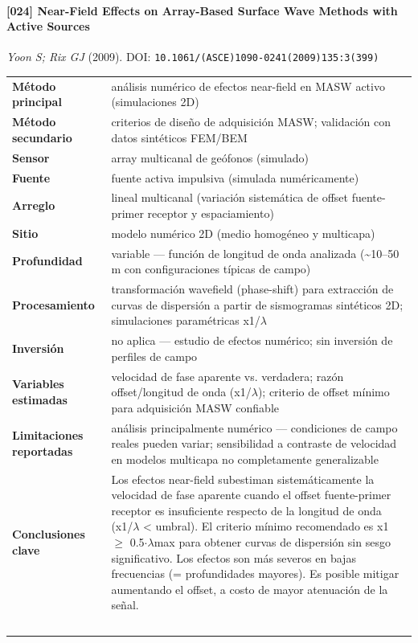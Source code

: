 \paragraph{[024] Near-Field Effects on Array-Based Surface Wave Methods with Active Sources} \emph{Yoon S; Rix GJ} (2009).
{\scriptsize DOI: \texttt{10.1061/(ASCE)1090-0241(2009)135:3(399)}}

\begin{center}\scriptsize
\begin{tabularx}{\textwidth}{@{}>{\bfseries}p{3.3cm} X@{}}
\toprule
M\'etodo principal & análisis numérico de efectos near-field en MASW activo (simulaciones 2D) \\
M\'etodo secundario & criterios de diseño de adquisición MASW; validación con datos sintéticos FEM/BEM \\
Sensor & array multicanal de geófonos (simulado) \\
Fuente & fuente activa impulsiva (simulada numéricamente) \\
Arreglo & lineal multicanal (variación sistemática de offset fuente-primer receptor y espaciamiento) \\
Sitio & modelo numérico 2D (medio homogéneo y multicapa) \\
Profundidad & variable --- función de longitud de onda analizada (\textasciitilde{}10--50 m con configuraciones típicas de campo) \\
Procesamiento & transformación wavefield (phase-shift) para extracción de curvas de dispersión a partir de sismogramas sintéticos 2D; simulaciones paramétricas x1/$\lambda$ \\
Inversi\'on & no aplica --- estudio de efectos numérico; sin inversión de perfiles de campo \\
Variables estimadas & velocidad de fase aparente vs. verdadera; razón offset/longitud de onda (x1/$\lambda$); criterio de offset mínimo para adquisición MASW confiable \\
Limitaciones reportadas & análisis principalmente numérico --- condiciones de campo reales pueden variar; sensibilidad a contraste de velocidad en modelos multicapa no completamente generalizable \\
Conclusiones clave & Los efectos near-field subestiman sistemáticamente la velocidad de fase aparente cuando el offset fuente-primer receptor es insuficiente respecto de la longitud de onda (x1/$\lambda$ < umbral). El criterio mínimo recomendado es x1 $\geq$ 0.5$\cdot$$\lambda$max para obtener curvas de dispersión sin sesgo significativo. Los efectos son más severos en bajas frecuencias (= profundidades mayores). Es posible mitigar aumentando el offset, a costo de mayor atenuación de la señal. \\
$$
\end{tabularx}
\end{center}
